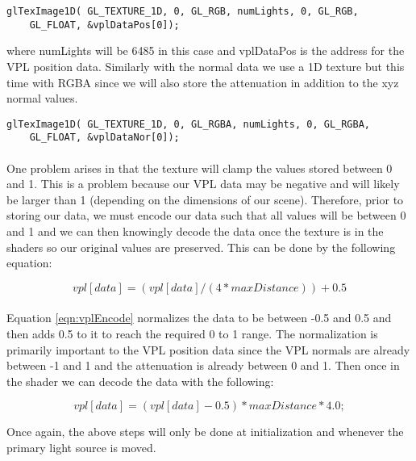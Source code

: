 \begin{lstlisting}
glTexImage1D( GL_TEXTURE_1D, 0, GL_RGB, numLights, 0, GL_RGB, 
	GL_FLOAT, &vplDataPos[0]);
\end{lstlisting}

where numLights will be 6485 in this case and vplDataPos is the address for the VPL position data.  Similarly with the normal data we use a 1D texture but this time with RGBA since we will also store the attenuation in addition to the xyz normal values.

\begin{lstlisting}
glTexImage1D( GL_TEXTURE_1D, 0, GL_RGBA, numLights, 0, GL_RGBA, 
	GL_FLOAT, &vplDataNor[0]);
\end{lstlisting}

\paragraph{}
One problem arises in that the texture will clamp the values stored between 0 and 1.  This is a problem because our VPL data may be negative and will likely be larger than 1 (depending on the dimensions of our scene).  Therefore, prior to storing our data, we must encode our data such that all values will be between 0 and 1 and we can then knowingly decode the data once the texture is in the shaders so our original values are preserved.  This can be done by the following equation:

\begin{equation}
vpl[data] = (vpl[data]/(4*maxDistance))+0.5 \label{eqn:vplEncode}
\end{equation}

\paragraph{}
Equation \ref{eqn:vplEncode} normalizes the data to be between -0.5 and 0.5 and then adds 0.5 to it to reach the required 0 to 1 range.  The normalization is primarily important to the VPL position data since the VPL normals are already between -1 and 1 and the attenuation is already between 0 and 1. Then once in the shader we can decode the data with the following:

\begin{equation}
vpl[data] = (vpl[data]-0.5)*maxDistance*4.0; \label{eqn:vplDecode}
\end{equation}

Once again, the above steps will only be done at initialization and whenever the primary light source is moved.

